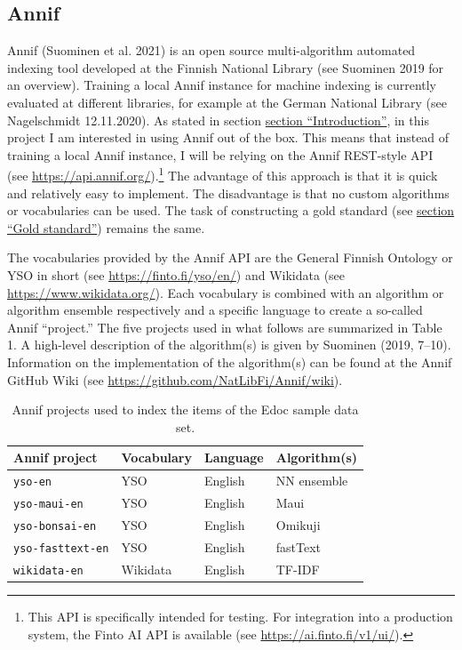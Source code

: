 \hypertarget{annif}{%
\subsection{Annif}\label{annif}}

Annif (Suominen et al. 2021) is an open source multi-algorithm automated
indexing tool developed at the Finnish National Library (see Suominen
2019 for an overview). Training a local Annif instance for machine
indexing is currently evaluated at different libraries, for example at
the German National Library (see Nagelschmidt 12.11.2020). As stated in
section \protect\hyperlink{introduction}{section ``Introduction''}, in
this project I am interested in using Annif out of the box. This means
that instead of training a local Annif instance, I will be relying on
the Annif REST-style API (see \url{https://api.annif.org/}).\footnote{This
  API is specifically intended for testing. For integration into a
  production system, the Finto AI API is available (see
  \url{https://ai.finto.fi/v1/ui/}).} The advantage of this approach is
that it is quick and relatively easy to implement. The disadvantage is
that no custom algorithms or vocabularies can be used. The task of
constructing a gold standard (see
\protect\hyperlink{gold-standard}{section ``Gold standard''}) remains
the same.

The vocabularies provided by the Annif API are the General Finnish
Ontology or YSO in short (see \url{https://finto.fi/yso/en/}) and
Wikidata (see \url{https://www.wikidata.org/}). Each vocabulary is
combined with an algorithm or algorithm ensemble respectively and a
specific language to create a so-called Annif ``project.'' The five
projects used in what follows are summarized in Table 1. A high-level
description of the algorithm(s) is given by Suominen (2019, 7--10).
Information on the implementation of the algorithm(s) can be found at
the Annif GitHub Wiki (see
\url{https://github.com/NatLibFi/Annif/wiki}).

\begin{table}[]
\centering
\begin{tabular}{llll}
Annif project   & Vocabulary & Language & Algorithm(s)   \\ \hline
\texttt{yso-en}  & YSO        & English  & NN ensemble \\
\texttt{yso-maui-en}     & YSO        & English  & Maui        \\
\texttt{yso-bonsai-en}   & YSO        & English  & Omikuji     \\
\texttt{yso-fasttext-en} & YSO        & English  & fastText    \\
\texttt{wikidata-en}     & Wikidata   & English  & TF-IDF     
\end{tabular}
\caption{Annif projects used to index the items of the Edoc sample data set.}
\label{tab:my-table}
\end{table}

